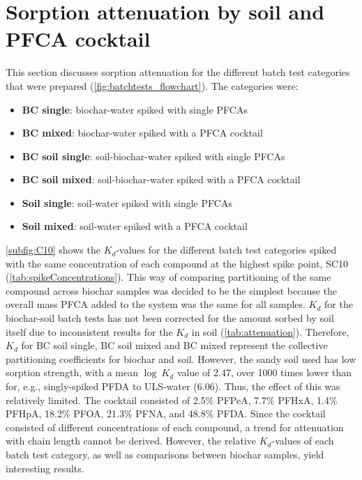 
\section{Sorption attenuation by soil and PFCA cocktail}
This section discusses sorption attenuation for the different batch test categories that were prepared (\cref{fig:batchtests_flowchart}). The categories were: 

\begin{itemize}
    \item \textbf{BC single}: biochar-water spiked with single PFCAs
    \item \textbf{BC mixed}: biochar-water spiked with a PFCA cocktail
    \item \textbf{BC soil single}: soil-biochar-water spiked with single PFCAs
    \item \textbf{BC soil mixed}: soil-biochar-water spiked with a PFCA cocktail
    \item \textbf{Soil single}: soil-water spiked with single PFCAs
    \item \textbf{Soil mixed}: soil-water spiked with a PFCA cocktail
\end{itemize}

\cref{subfig:C10} shows the $K_d$-values for the different batch test categories spiked with the same concentration of each compound at the highest spike point, SC10 (\cref{tab:spikeConcentrations}). This way of comparing partitioning of the same compound across biochar samples was decided to be the simplest because the overall mass PFCA added to the system was the same for all samples. $K_d$ for the biochar-soil batch tests has not been corrected for the amount sorbed by soil itself due to inconsistent results for the $K_d$ in soil (\cref{tab:attenuation}). Therefore, $K_d$ for BC soil single, BC soil mixed and BC mixed represent the collective partitioning coefficients for biochar and soil. However, the sandy soil used has low sorption strength, with a mean $\log~K_d$ value of 2.47, over 1000 times lower than for, e.g., singly-spiked PFDA to ULS-water (6.06). Thus, the effect of this was relatively limited. The cocktail consisted of 2.5\% PFPeA, 7.7\% PFHxA, 1.4\% PFHpA, 18.2\% PFOA, 21.3\% PFNA, and 48.8\% PFDA. Since the cocktail consisted of different concentrations of each compound, a trend for attenuation with chain length cannot be derived. However, the relative $K_d$-values of each batch test category, as well as comparisons between biochar samples, yield interesting results.

